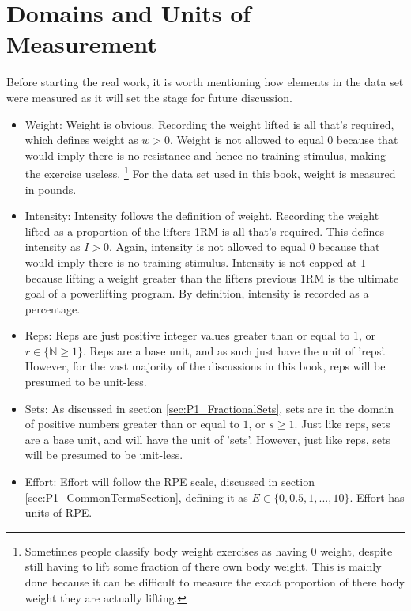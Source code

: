 \section{Domains and Units of Measurement}
\label{sec:P1C2_UnitsOfMeasurement}

Before starting the real work, it is worth mentioning how elements in the data set were measured as it will set the stage for future discussion.

\begin{itemize}
	\item Weight: Weight is obvious. Recording the weight lifted is all that's required, which defines weight as $w>0$. Weight is not allowed to equal $0$ because that would imply there is no resistance and hence no training stimulus, making the exercise useless. \footnote{Sometimes people classify body weight exercises as having $0$ weight, despite still having to lift some fraction of there own body weight. This is mainly done because it can be difficult to measure the exact proportion of there body weight they are actually lifting.} For the data set used in this book, weight is measured in pounds.
	
	\item Intensity: Intensity follows the definition of weight. Recording the weight lifted as a proportion of the lifters 1RM is all that's required. This defines intensity as $I>0$. Again, intensity is not allowed to equal $0$ because that would imply there is no training stimulus. Intensity is not capped at $1$ because lifting a weight greater than the lifters previous 1RM is the ultimate goal of a powerlifting program. By definition, intensity is recorded as a percentage.
	
	\item Reps: Reps are just positive integer values greater than or equal to $1$, or $r\in \{ \mathbb{N} \ge 1 \}$. Reps are a base unit, and as such just have the unit of 'reps'. However, for the vast majority of the discussions in this book, reps will be presumed to be unit-less.
	
	\item Sets: As discussed in section \ref{sec:P1_FractionalSets}, sets are in the domain of positive numbers greater than or equal to $1$, or $s\ge 1$. Just like reps, sets are a base unit, and will have the unit of 'sets'. However, just like reps, sets will be presumed to be unit-less.
	
	\item Effort: Effort will follow the RPE scale, discussed in section \ref{sec:P1_CommonTermsSection}, defining it as $E\in \{0,0.5,1,...,10\}$. Effort has units of RPE.
	

\end{itemize}
